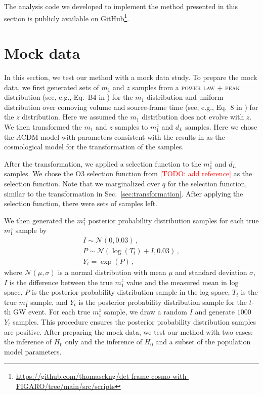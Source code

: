 \documentclass[sn-aps, pdflatex]{sn-jnl}
\newcommand{\todo}[1]{\textcolor{red}{[TODO: #1]}}
\begin{document}
The analysis code we developed to implement the method presented in this section is publicly available on GitHub\footnote{ \url{https://github.com/thomasckng/det-frame-cosmo-with-FIGARO/tree/main/src/scripts}}.

\section{Mock data}
\label{sec:mock_data}

In this section, we test our method with a mock data study.
To prepare the mock data, we first generated  sets of $m_1$ and $z$ samples from a \textsc{power law + peak} distribution (see, e.g., Eq.~B4 in \cite{KAGRA:2021duu}) for the $m_1$ distribution and uniform distribution over comoving volume and source-frame time (see, e.g., Eq.~8 in \cite{KAGRA:2021duu}) for the $z$ distribution.
Here we assumed the $m_1$ distribution does not evolve with $z$.
We then transformed the $m_1$ and $z$ samples to $m^z_1$ and $d_L$ samples.
Here we chose the $\Lambda$CDM model with parameters consistent with the results in \cite{Planck:2018vyg} as the cosmological model for the transformation of the samples.

After the transformation, we applied a selection function to the $m^z_1$ and $d_L$ samples.
We chose the O3 selection function from \todo{add reference} as the selection function.
Note that we marginalized over $q$ for the selection function, similar to the transformation in Sec.~\ref{sec:transformation}.
After applying the selection function, there were  sets of samples left.

We then generated the $m^z_1$ posterior probability distribution samples for each true $m^z_1$ sample by
\begin{gather*}
    I \sim \mathcal{N}(0, 0.03)\,,\\
    P \sim \mathcal{N}(\log(T_t)+I, 0.03)\,,\\
    Y_t = \exp(P)\,,
\end{gather*}
where $\mathcal{N}(\mu, \sigma)$ is a normal distribution with mean $\mu$ and standard deviation $\sigma$, $I$ is the difference between the true $m^z_1$ value and the measured mean in log space, $P$ is the posterior probability distribution sample in the log space, $T_t$ is the true $m^z_1$ sample, and $Y_t$ is the posterior probability distribution sample for the $t$-th \ac{GW} event.
For each true $m^z_1$ sample, we draw a random $I$ and generate $1000$ $Y_t$ samples.
This procedure ensures the posterior probability distribution samples are positive.
After preparing the mock data, we test our method with two cases: the inference of $H_0$ only and the inference of $H_0$ and a subset of the population model parameters.
\end{document}
